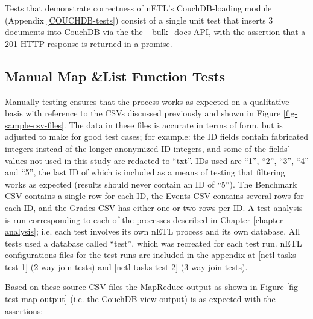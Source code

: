 Tests that demonstrate correctness of nETL's CouchDB-loading module (Appendix \ref{COUCHDB-tests}) consist of a single unit test that inserts 3 documents into CouchDB via the the \_bulk\_docs API, with the assertion that a 201 HTTP response is returned in a promise.

\subsection{Manual Map \&List Function Tests}
Manually testing ensures that the process works as expected on a qualitative basis with reference to the CSVs discussed previously and shown in Figure \ref{fig-sample-csv-files}. The data in these files is accurate in terms of form, but is adjusted to make for good test cases; for example: the ID fields contain fabricated integers instead of the longer anonymized ID integers, and some of the fields' values not used in this study are redacted to ``txt''. IDs used are ``1'', ``2'', ``3'', ``4'' and ``5'', the last ID of which is included as a means of testing that filtering works as expected (results should never contain an ID of ``5''). The Benchmark CSV contains a single row for each ID, the Events CSV contains several rows for each ID, and the Grades CSV has either one or two rows per ID. A test analysis is run corresponding to each of the processes described in Chapter \ref{chapter-analysis}; i.e. each test involves its own nETL process and its own database. All tests used a database called ``test'', which was recreated for each test run. nETL configurations files for the test runs are included in the appendix at \ref{netl-tasks-test-1} (2-way join tests) and \ref{netl-tasks-test-2} (3-way join tests).

Based on these source CSV files the MapReduce output as shown in Figure \ref{fig-test-map-output} (i.e. the CouchDB view output) is as expected with the assertions:

